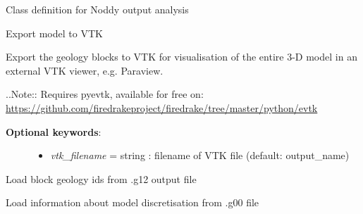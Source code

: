 \documentclass[letterpaper,10pt,english]{sphinxmanual}
\begin{document}
\begin{fulllineitems}
\label{pynoddy:pynoddy.output.NoddyOutput}
Class definition for Noddy output analysis

\begin{fulllineitems}
\label{pynoddy:pynoddy.output.NoddyOutput.export_to_vtk}
Export model to VTK

Export the geology blocks to VTK for visualisation of the entire 3-D model in an
external VTK viewer, e.g. Paraview.

..Note:: Requires pyevtk, available for free on: \href{https://github.com/firedrakeproject/firedrake/tree/master/python/evtk}{https://github.com/firedrakeproject/firedrake/tree/master/python/evtk}
\begin{description}
\item[{\textbf{Optional keywords}:}] \leavevmode\begin{itemize}
\item {} 
\emph{vtk\_filename} = string : filename of VTK file (default: output\_name)

\end{itemize}

\end{description}

\end{fulllineitems}


\begin{fulllineitems}
\label{pynoddy:pynoddy.output.NoddyOutput.load_geology}
Load block geology ids from .g12 output file

\end{fulllineitems}


\begin{fulllineitems}
\label{pynoddy:pynoddy.output.NoddyOutput.load_model_info}
Load information about model discretisation from .g00 file

\end{fulllineitems}


\end{fulllineitems}
\end{document}
